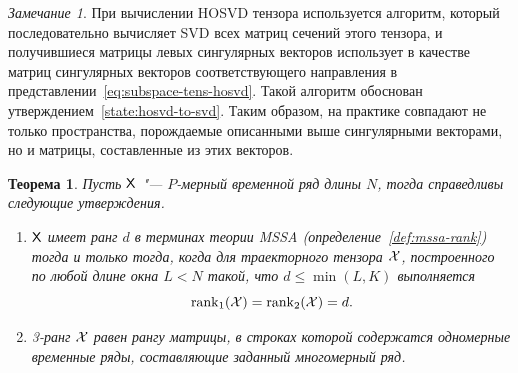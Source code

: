 \documentclass[specialist,
    substylefile = spbu.rtx,
    subf,href,colorlinks=true, 12pt]{disser}
\theoremstyle{plain}
\newtheorem{theorem}{Теорема}
\theoremstyle{definition}
\newtheorem{definition}{Определение}[section]
\theoremstyle{remark}
\newtheorem*{remark}{Замечание}
\begin{document}
    \begin{remark}
        При вычислении HOSVD тензора используется алгоритм, который последовательно вычисляет SVD всех матриц сечений
        этого тензора, и получившиеся матрицы левых сингулярных векторов использует в качестве матриц сингулярных
        векторов соответствующего направления в представлении~\eqref{eq:subspace-tens-hosvd}.
        Такой алгоритм обоснован утверждением~\ref{state:hosvd-to-svd}.
        Таким образом, на практике совпадают не только пространства, порождаемые описанными выше сингулярными векторами,
        но и матрицы, составленные из этих векторов.
    \end{remark}

    \begin{theorem}
        \label{state:hosvd-mssa-rang}
        Пусть $\mathsf{X}$ "--- $P$-мерный временной ряд длины $N$, тогда справедливы следующие утверждения.
        \begin{enumerate}
            \item $\mathsf{X}$ имеет ранг $d$ в терминах теории \emph{MSSA} (определение~\ref{def:mssa-rank})
            тогда и только тогда, когда для траекторного тензора $\mathcal{X}$, построенного по любой длине окна
            $L<N$ такой, что $d \leqslant\min(L, K)$ выполняется
            \[\operatorname{rank}_1(\mathcal{X}) = \operatorname{rank}_2(\mathcal{X}) = d.\]
            \item 3-ранг $\mathcal{X}$ равен рангу матрицы,
            в строках которой содержатся одномерные временные ряды, составляющие заданный
            многомерный ряд.
        \end{enumerate}
    \end{theorem}
\end{document}
